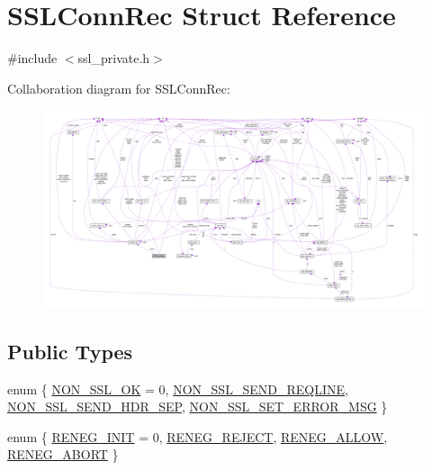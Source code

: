 \hypertarget{structSSLConnRec}{}\section{S\+S\+L\+Conn\+Rec Struct Reference}
\label{structSSLConnRec}


{\ttfamily \#include $<$ssl\+\_\+private.\+h$>$}



Collaboration diagram for S\+S\+L\+Conn\+Rec\+:
\nopagebreak
\begin{figure}[H]
\begin{center}
\leavevmode
\includegraphics[width=350pt]{structSSLConnRec__coll__graph}
\end{center}
\end{figure}
\subsection*{Public Types}
\begin{DoxyCompactItemize}
\item 
enum \{ \hyperlink{structSSLConnRec_a15459fb4bdcae2344e789314be9d2ffda11b1b56b93188a71fd7d85002ca113e8}{N\+O\+N\+\_\+\+S\+S\+L\+\_\+\+OK} = 0, 
\hyperlink{structSSLConnRec_a15459fb4bdcae2344e789314be9d2ffdac4763835f3ef448f5c981917f98e6ba9}{N\+O\+N\+\_\+\+S\+S\+L\+\_\+\+S\+E\+N\+D\+\_\+\+R\+E\+Q\+L\+I\+NE}, 
\hyperlink{structSSLConnRec_a15459fb4bdcae2344e789314be9d2ffdae8c471adea8d0d6e4a64b57c5f98d0e5}{N\+O\+N\+\_\+\+S\+S\+L\+\_\+\+S\+E\+N\+D\+\_\+\+H\+D\+R\+\_\+\+S\+EP}, 
\hyperlink{structSSLConnRec_a15459fb4bdcae2344e789314be9d2ffdad64c96c19f782f4d30f93059788fb1b2}{N\+O\+N\+\_\+\+S\+S\+L\+\_\+\+S\+E\+T\+\_\+\+E\+R\+R\+O\+R\+\_\+\+M\+SG}
 \}
\item 
enum \{ \hyperlink{structSSLConnRec_af7ee32568a28fd0e490ccf301cb6ed0caf04db4f4ad06eb4059512dd7290dc923}{R\+E\+N\+E\+G\+\_\+\+I\+N\+IT} = 0, 
\hyperlink{structSSLConnRec_af7ee32568a28fd0e490ccf301cb6ed0ca949d188d9ba39b42e7f0b89dccb7cfd0}{R\+E\+N\+E\+G\+\_\+\+R\+E\+J\+E\+CT}, 
\hyperlink{structSSLConnRec_af7ee32568a28fd0e490ccf301cb6ed0ca43decdf6afe45cf205c25ebb194cab87}{R\+E\+N\+E\+G\+\_\+\+A\+L\+L\+OW}, 
\hyperlink{structSSLConnRec_af7ee32568a28fd0e490ccf301cb6ed0ca93c1406266f4b6c2d9feef4ab5dedbfe}{R\+E\+N\+E\+G\+\_\+\+A\+B\+O\+RT}
 \}
\end{DoxyCompactItemize}
